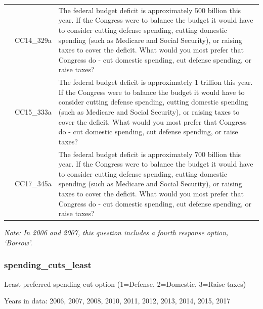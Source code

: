 \documentclass[
  12pt]{article}
\begin{document}
\begin{longtable}[t]{rl>{\raggedright\arraybackslash}p{10cm}}
\addlinespace
2014 & CC14\_329a & The federal budget deficit is approximately 500 billion this year. If the Congress were to balance the budget it would have to consider cutting defense spending, cutting domestic spending (such as Medicare and Social Security), or raising taxes to cover the deficit. What would you most prefer that Congress do - cut domestic spending, cut defense spending, or raise taxes?\\
\addlinespace
2015 & CC15\_333a & The federal budget deficit is approximately 1 trillion this year. If the Congress were to balance the budget it would have to consider cutting defense spending, cutting domestic spending (such as Medicare and Social Security), or raising taxes to cover the deficit. What would you most prefer that Congress do - cut domestic spending, cut defense spending, or raise taxes?\\
\addlinespace
2017 & CC17\_345a & The federal budget deficit is approximately 700 billion this year. If the Congress were to balance the budget it would have to consider cutting defense spending, cutting domestic spending (such as Medicare and Social Security), or raising taxes to cover the deficit. What would you most prefer that Congress do - cut domestic spending, cut defense spending, or raise taxes?\\*
\end{longtable}
\endgroup{}

\emph{Note: In 2006 and 2007, this question includes a fourth response
option, `Borrow'.}

\hypertarget{spending_cuts_least}{%
\subsubsection{spending\_cuts\_least}\label{spending_cuts_least}}

Least preferred spending cut option (1=Defense, 2=Domestic, 3=Raise
taxes)

Years in data: 2006, 2007, 2008, 2010, 2011, 2012, 2013, 2014, 2015,
2017\begingroup\fontsize{10}{12}\selectfont
\end{document}

